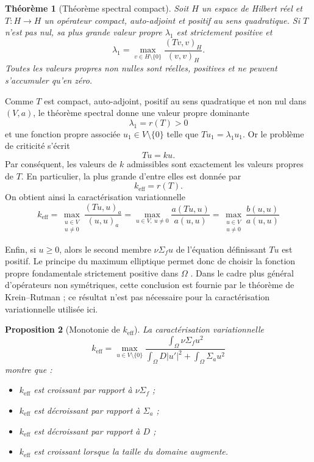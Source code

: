 \documentclass{article}
\newtheorem{theorem}{Théorème}[section]
\newtheorem{proposition}[theorem]{Proposition}
\begin{document}
\begin{theorem}[Théorème spectral compact]
Soit $H$ un espace de Hilbert réel et $T:H\to H$ un opérateur compact, auto-adjoint et positif au sens quadratique. Si $T$ n'est pas nul, sa plus grande valeur propre $\lambda_1$ est strictement positive et
\[
\lambda_1=\max_{v\in H\setminus\{0\}}\frac{(Tv,v)_H}{(v,v)_H}.
\]
Toutes les valeurs propres non nulles sont réelles, positives et ne peuvent s'accumuler qu'en zéro.
\end{theorem}

Comme $T$ est compact, auto-adjoint, positif au sens quadratique et non nul dans $(V,a)$, le théorème spectral donne une valeur propre dominante
\[ \lambda_1=r(T)>0 \]
et une fonction propre associée $u_1\in V\setminus\{0\}$ telle que $Tu_1=\lambda_1u_1$.
Or le problème de criticité s'écrit
\[ Tu=ku. \] 
Par conséquent, les valeurs de $k$ admissibles sont exactement les valeurs propres de $T$. En particulier, la plus grande d'entre elles est donnée par 
\[ k_{\mathrm{eff}}=r(T). \] 
On obtient ainsi la caractérisation variationnelle 
\[ k_{\mathrm{eff}} = \max_{\substack{u\in V\\u\neq 0}} \frac{(Tu,u)_a}{(u,u)_a}=\max_{u\in V,\ u\neq 0} \frac{a(Tu,u)}{a(u,u)}=\max_{\substack{u\in V\\u\neq 0}} \frac{b(u,u)}{a(u,u)} \]

Enfin, si $u\geq0$, alors le second membre $\nu\Sigma_fu$ de l'équation définissant $Tu$ est positif. Le principe du maximum elliptique permet donc de choisir la fonction propre fondamentale strictement positive dans $\Omega$ \cite{Evans2010}. Dans le cadre plus général d'opérateurs non symétriques, cette conclusion est fournie par le théorème de Krein--Rutman \cite{KreinRutman1948,Schaefer1974}; ce résultat n'est pas nécessaire pour la caractérisation variationnelle utilisée ici.

\begin{proposition}[Monotonie de $k_{\mathrm{eff}}$] 
    La caractérisation variationnelle 
    \[ 
    \boxed{ k_{\mathrm{eff}} = \max_{u\in V\setminus\{0\}} \frac{\displaystyle\int_\Omega \nu\Sigma_f u^2} {\displaystyle\int_\Omega D|u'|^2 +\int_\Omega \Sigma_a u^2} }
    \] 
    montre que : 
    \begin{itemize} 
        \item $k_{\mathrm{eff}}$ est croissant par rapport à $\nu\Sigma_f$ ; 
        \item $k_{\mathrm{eff}}$ est décroissant par rapport à $\Sigma_a$ ; 
        \item $k_{\mathrm{eff}}$ est décroissant par rapport à $D$ ; 
        \item $k_{\mathrm{eff}}$ est croissant lorsque la taille du domaine augmente. 
    \end{itemize} 
\end{proposition}
\end{document}

